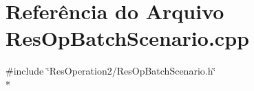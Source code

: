 \section{Referência do Arquivo Res\+Op\+Batch\+Scenario.\+cpp}
\label{_res_op_batch_scenario_8cpp}
{\ttfamily \#include \char`\"{}Res\+Operation2/\+Res\+Op\+Batch\+Scenario.\+h\char`\"{}}\\*
